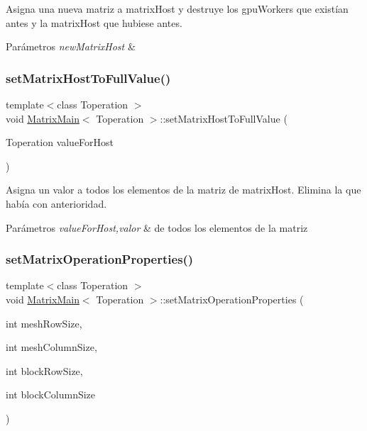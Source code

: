 Asigna una nueva matriz a matrix\+Host y destruye los gpu\+Workers que existían antes y la matrix\+Host que hubiese antes. 


\begin{DoxyParams}{Parámetros}
{\em new\+Matrix\+Host} & \\
\hline
\end{DoxyParams}
\mbox{\label{classMatrixMain_aa6fa4a668ce7857289dc0931b319429e}} 
\subsubsection{\texorpdfstring{set\+Matrix\+Host\+To\+Full\+Value()}{setMatrixHostToFullValue()}}
{\footnotesize\ttfamily template$<$class Toperation $>$ \\
void \hyperlink{classMatrixMain}{Matrix\+Main}$<$ Toperation $>$\+::set\+Matrix\+Host\+To\+Full\+Value (\begin{DoxyParamCaption}\item[{Toperation}]{value\+For\+Host }\end{DoxyParamCaption})}



Asigna un valor a todos los elementos de la matriz de matrix\+Host. Elimina la que había con anterioridad. 


\begin{DoxyParams}{Parámetros}
{\em value\+For\+Host,valor} & de todos los elementos de la matriz \\
\hline
\end{DoxyParams}
\mbox{\label{classMatrixMain_a955eceba34f3a4b617a6fab1a97159cd}} 
\subsubsection{\texorpdfstring{set\+Matrix\+Operation\+Properties()}{setMatrixOperationProperties()}}
{\footnotesize\ttfamily template$<$class Toperation $>$ \\
void \hyperlink{classMatrixMain}{Matrix\+Main}$<$ Toperation $>$\+::set\+Matrix\+Operation\+Properties (\begin{DoxyParamCaption}\item[{int}]{mesh\+Row\+Size,  }\item[{int}]{mesh\+Column\+Size,  }\item[{int}]{block\+Row\+Size,  }\item[{int}]{block\+Column\+Size }\end{DoxyParamCaption})}



